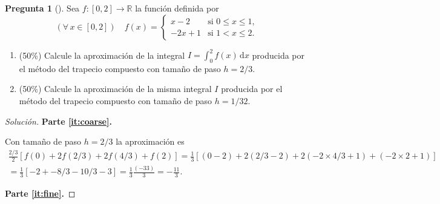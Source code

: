 \documentclass[letter,12pt]{article}
\theoremstyle{definition}
\newtheorem{question}{Pregunta}
\numberwithin{equation}{question}
\newenvironment{solution}{\begin{proof}[Solución]}{\end{proof}}
\begin{document}
\newpage
\begin{question}[] Sea $f \colon [0,2] \to \mathbb{R}$ la función definida por
%
\begin{equation*}
(\forall\,x\in[0,2]) \quad f(x)
= \begin{cases} x-2 & \text{si } 0 \leq x \leq 1,\\
-2x + 1 & \text{si } 1 < x \leq 2.
\end{cases}
\end{equation*}
%
\begin{enumerate}
\item\label{it:coarse} (50\%) Calcule la aproximación de la integral $I = \int_0^2 f(x) \, \mathrm{d}x$ producida por el método del trapecio compuesto con tamaño de paso $h = 2/3$.
\item\label{it:fine} (50\%) Calcule la aproximación de la misma integral $I$ producida por el método del trapecio compuesto con tamaño de paso $h = 1/32$.
\end{enumerate}

\begin{solution}
\textbf{Parte \ref{it:coarse}.}

\smallskip
\noindent{}

Con tamaño de paso $h = 2/3$ la aproximación es
%
\begin{multline*}
\frac{2/3}{2}\left[f(0) + 2 f(2/3) + 2 f(4/3) + f(2)\right]
= \frac{1}{3}\left[(0-2) + 2(2/3-2) + 2(-2\times4/3+1) + (-2\times2+1)\right]\\
= \frac{1}{3}\left[-2 + -8/3 - 10/3 - 3\right]
= \frac{1}{3} \frac{(-33)}{3} = -\frac{11}{3}.
\end{multline*}

\medskip

\textbf{Parte \ref{it:fine}.}

\smallskip
\noindent{}


\end{solution}
\end{question}
\end{document}

